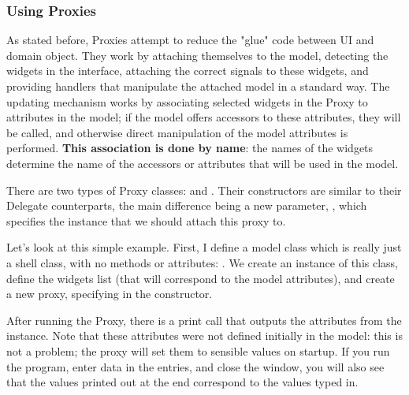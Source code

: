 \documentclass[a4paper]{howto}
\begin{document}
\subsubsection{Using Proxies}

As stated before, Proxies attempt to reduce the "glue" code between UI
and domain object.  They work by attaching themselves to the model,
detecting the widgets in the interface, attaching the correct signals to
these widgets, and providing handlers that manipulate the attached model
in a standard way.  The updating mechanism works by associating selected
widgets in the Proxy to attributes in the model; if the model offers
accessors to these attributes, they will be called, and otherwise direct
manipulation of the model attributes is performed. {\bf This association
is done by name}: the names of the widgets determine the name of the
accessors or attributes that will be used in the model.

There are two types of Proxy classes:  and
. Their constructors are similar to their Delegate
counterparts, the main difference being a new parameter, ,
which specifies the instance that we should attach this proxy to.





Let's look at this simple example. First, I define a model class which
is really just a shell class, with no methods or attributes:
. We create an instance of this class, define the
widgets list (that will correspond to the model attributes), and create
a new proxy, specifying  in the constructor.

After running the Proxy, there is a print call that outputs the
attributes from the  instance. Note that these attributes
were not defined initially in the model: this is not a problem; the
proxy will set them to sensible values on startup. If you run the
program, enter data in the entries, and close the window, you will also
see that the values printed out at the end correspond to the values
typed in.
\end{document}
